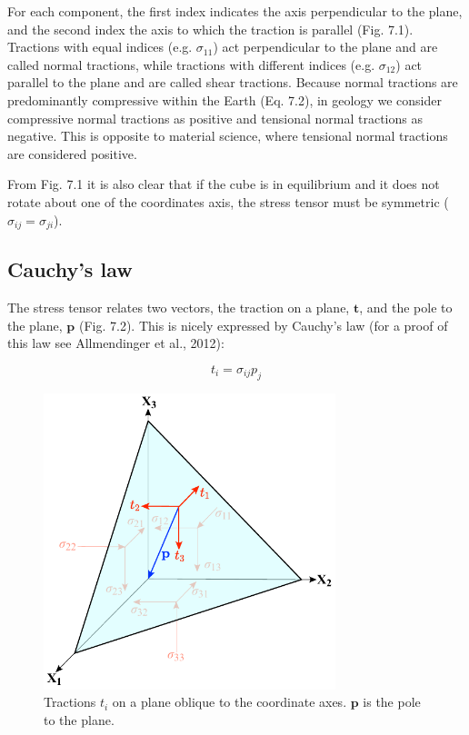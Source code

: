 \documentclass[a4paper , 12pt]{book}
\begin{document}
For each component, the first index indicates the axis perpendicular to the plane, and the second index the axis to which the traction is parallel (Fig. 7.1). Tractions with equal indices (e.g. $\sigma_{11}$) act perpendicular to the plane and are called normal tractions, while tractions with different indices (e.g. $\sigma_{12}$) act parallel to the plane and are called shear tractions. Because normal tractions are predominantly compressive within the Earth (Eq. 7.2), in geology we consider compressive normal tractions as positive and tensional normal tractions as negative. This is opposite to material science, where tensional normal tractions are considered positive.

From Fig. 7.1 it is also clear that if the cube is in equilibrium and it does not rotate about one of the coordinates axis, the stress tensor must be symmetric ($\sigma_{ij}=\sigma_{ji}$).

\subsection{Cauchy's law}

The stress tensor relates two vectors, the traction on a plane, $\mathbf{t}$, and the pole to the plane, $\mathbf{p}$ (Fig. 7.2). This is nicely expressed by Cauchy's law (for a proof of this law see Allmendinger et al., 2012):

\begin{equation}
    t_i=\sigma_{ij}p_j
\end{equation}

\begin{figure}[ht]
    \centering
    \includegraphics[width=8.5cm]{ch7f2.pdf}
    \caption{Tractions $t_i$ on a plane oblique to the coordinate axes. $\mathbf{p}$ is the pole to the plane.}
\end{figure}
\end{document}
